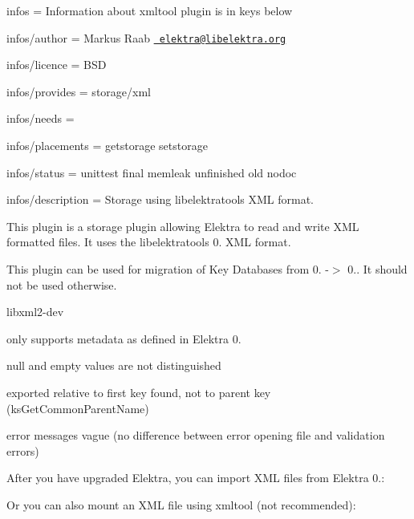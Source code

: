 
\begin{DoxyItemize}
\item infos = Information about xmltool plugin is in keys below
\item infos/author = Markus Raab \href{mailto:elektra@libelektra.org}{\texttt{ elektra@libelektra.\+org}}
\item infos/licence = B\+SD
\item infos/provides = storage/xml
\item infos/needs =
\item infos/placements = getstorage setstorage
\item infos/status = unittest final memleak unfinished old nodoc
\item infos/description = Storage using libelektratools X\+ML format.
\end{DoxyItemize}

This plugin is a storage plugin allowing Elektra to read and write X\+ML formatted files. It uses the {\ttfamily libelektratools} 0. X\+ML format.

This plugin can be used for migration of Key Databases from 0. -\/$>$ 0.. It should not be used otherwise.


\begin{DoxyItemize}
\item {\ttfamily libxml2-\/dev}
\end{DoxyItemize}


\begin{DoxyItemize}
\item only supports metadata as defined in Elektra 0.
\item null and empty values are not distinguished
\item exported relative to first key found, not to parent key (ks\+Get\+Common\+Parent\+Name)
\item error messages vague (no difference between error opening file and validation errors)
\end{DoxyItemize}

After you have upgraded Elektra, you can import X\+ML files from Elektra 0.\+:


\begin{DoxyCode}{0}
\end{DoxyCode}


Or you can also mount an X\+ML file using {\ttfamily xmltool} (not recommended)\+:


\begin{DoxyCode}{0}
\end{DoxyCode}
 